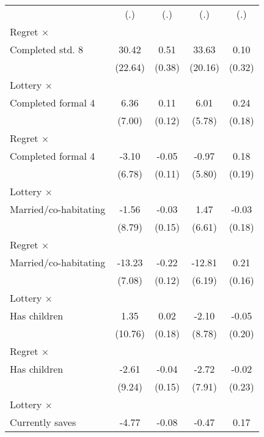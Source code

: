 \begin{table}[htbp]
\begin{tabular}{l*{4}{c}}
                &      (.)         &      (.)         &      (.)         &      (.)         \\
\addlinespace
Regret $\times$ \\ Completed std. 8&    30.42         &     0.51         &    33.63\sym{*}  &     0.10         \\
                &  (22.64)         &   (0.38)         &  (20.16)         &   (0.32)         \\
\addlinespace
Lottery $\times$ \\ Completed formal 4&     6.36         &     0.11         &     6.01         &     0.24         \\
                &   (7.00)         &   (0.12)         &   (5.78)         &   (0.18)         \\
\addlinespace
Regret $\times$ \\ Completed formal 4&    -3.10         &    -0.05         &    -0.97         &     0.18         \\
                &   (6.78)         &   (0.11)         &   (5.80)         &   (0.19)         \\
\addlinespace
Lottery $\times$ \\ Married/co-habitating&    -1.56         &    -0.03         &     1.47         &    -0.03         \\
                &   (8.79)         &   (0.15)         &   (6.61)         &   (0.18)         \\
\addlinespace
Regret $\times$ \\ Married/co-habitating&   -13.23\sym{*}  &    -0.22\sym{*}  &   -12.81\sym{**} &     0.21         \\
                &   (7.08)         &   (0.12)         &   (6.19)         &   (0.16)         \\
\addlinespace
Lottery $\times$ \\ Has children&     1.35         &     0.02         &    -2.10         &    -0.05         \\
                &  (10.76)         &   (0.18)         &   (8.78)         &   (0.20)         \\
\addlinespace
Regret $\times$ \\ Has children&    -2.61         &    -0.04         &    -2.72         &    -0.02         \\
                &   (9.24)         &   (0.15)         &   (7.91)         &   (0.23)         \\
\addlinespace
Lottery $\times$ \\ Currently saves&    -4.77         &    -0.08         &    -0.47         &     0.17         \\

\end{tabular}
\end{table}
